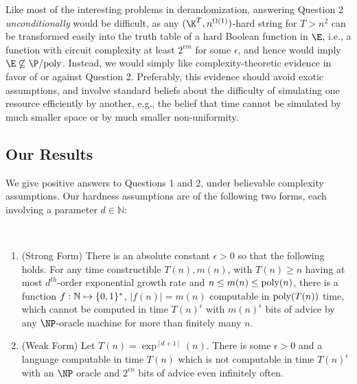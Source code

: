 Like most of the interesting problems in derandomization, answering Question 2 {\it unconditionally} would be difficult, as any $(\K^T, n^{\Omega(1)})$-hard string for $T > n^2$ can be transformed easily into the truth table of a hard Boolean function in $\E$, i.e., a function with circuit complexity at least $2^{\epsilon m}$ for some $\epsilon$, and hence would imply $\E \not\subseteq \P/\poly$. 
Instead, we would simply like complexity-theoretic evidence in favor of or against Question 2. Preferably, this evidence should avoid exotic assumptions, and involve standard beliefs about the difficulty of simulating one resource efficiently by another, e.g., the belief that time cannot be simulated by much smaller space or by much smaller non-uniformity. 


\subsection{Our Results}

We give positive answers to Questions 1 and 2, under believable complexity assumptions. Our hardness assumptions are of the following two forms, each involving a parameter $d \in \mathbb{N}$:
\begin{hypothesis*}
~
\begin{enumerate}
    \item (Strong Form) There is an absolute constant $\epsilon > 0$ so that the following holds. For any time constructible $T(n), m(n)$, with $T(n) \geq n$ having at most $d^{th}$-order exponential growth rate and $n \leq m(n) \leq \mathrm{poly}(n)$, there is a function $f:\mathbb{N} \mapsto \{0,1\}^{*}$, $|f(n)| =m(n)$ computable in $\mathrm{poly}(T(n))$ time, which cannot be computed in time $T(n)^\epsilon$ with $m(n)^\epsilon$ bits of advice by any $\NP$-oracle machine for more than finitely many $n$.
    \item (Weak Form) Let $T(n) = \exp^{[d+1]}(n)$. There is some $\epsilon>0$ and a language computable in time $T(n)$ which is not computable in time $T(n)^\epsilon$ with an $\NP$ oracle and $2^{\epsilon n}$ bits of advice even infinitely often.
\end{enumerate}
\end{hypothesis*}


